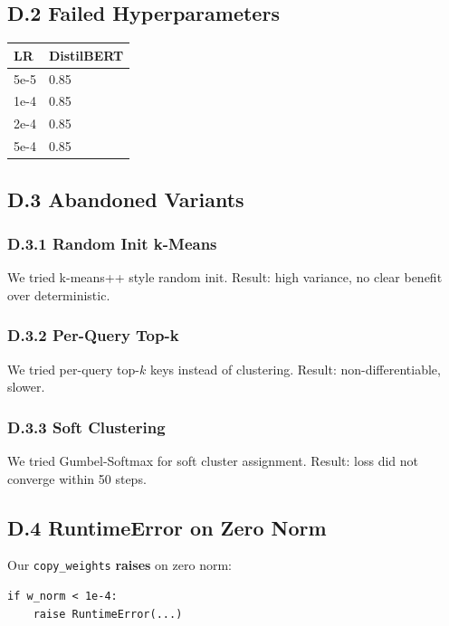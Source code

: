 \subsection{D.2 Failed Hyperparameters}

\begin{table}[H]
\centering
\small
\begin{tabular}{ll}
\toprule
\textbf{LR} & \textbf{DistilBERT} \\
\midrule
5e-5 & 0.85 \\
1e-4 & 0.85 \\
2e-4 & 0.85 \\
5e-4 & 0.85 \\
\bottomrule
\end{tabular}
\end{table}

\subsection{D.3 Abandoned Variants}

\subsubsection{D.3.1 Random Init k-Means}

We tried k-means++ style random init. Result: high variance, no clear 
benefit over deterministic.

\subsubsection{D.3.2 Per-Query Top-k}

We tried per-query top-$k$ keys instead of clustering. Result: non-differentiable, 
slower.

\subsubsection{D.3.3 Soft Clustering}

We tried Gumbel-Softmax for soft cluster assignment. Result: loss did not 
converge within 50 steps.

\subsection{D.4 RuntimeError on Zero Norm}

Our \texttt{copy\_weights} \textbf{raises} on zero norm:

\begin{lstlisting}
if w_norm < 1e-4:
    raise RuntimeError(...)
\end{lstlisting}


